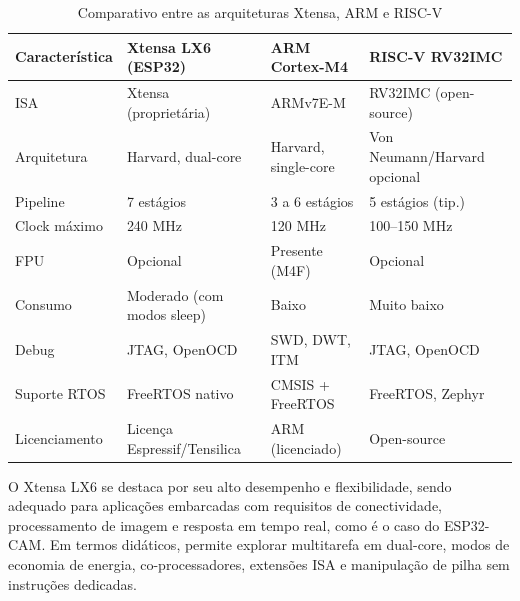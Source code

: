 \documentclass[12pt, letterpaper, twoside]{article}
\begin{document}
\begin{table}[H]
    \centering
    \renewcommand{\arraystretch}{1.5}
    
    
    \label{tab:comparativo_arqs}
    
    \begin{tabularx}{\textwidth}{l X X X}
        \toprule
        \textbf{Característica} & \textbf{Xtensa LX6 (ESP32)} & \textbf{ARM Cortex-M4} & \textbf{RISC-V RV32IMC} \\
        \midrule
        ISA                       & Xtensa (proprietária)       & ARMv7E-M                & RV32IMC (open-source) \\
        Arquitetura               & Harvard, dual-core          & Harvard, single-core    & Von Neumann/Harvard opcional \\
        Pipeline                  & 7 estágios                  & 3 a 6 estágios          & 5 estágios (tip.) \\
        Clock máximo              & 240 MHz                     & 120 MHz                 & 100--150 MHz \\
        FPU                       & Opcional                    & Presente (M4F)          & Opcional \\
        Consumo                   & Moderado (com modos sleep)  & Baixo                   & Muito baixo \\
        Debug                     & JTAG, OpenOCD               & SWD, DWT, ITM           & JTAG, OpenOCD \\
        Suporte RTOS              & FreeRTOS nativo             & CMSIS + FreeRTOS        & FreeRTOS, Zephyr \\
        Licenciamento             & Licença Espressif/Tensilica & ARM (licenciado)        & Open-source \\
        \bottomrule
    \end{tabularx}
    \caption{Comparativo entre as arquiteturas Xtensa, ARM e RISC-V}
\end{table}

O Xtensa LX6 se destaca por seu alto desempenho e flexibilidade, sendo adequado para aplicações embarcadas com requisitos de conectividade, processamento de imagem e resposta em tempo real, como é o caso do ESP32-CAM. Em termos didáticos, permite explorar multitarefa em dual-core, modos de economia de energia, co-processadores, extensões ISA e manipulação de pilha sem instruções dedicadas.
\end{document}
